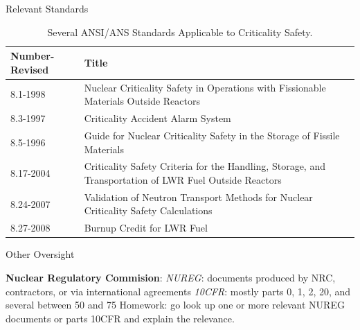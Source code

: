 \documentclass[10pt]{beamer}
\begin{document}
\begin{frame}{Relevant Standards}

\begin{table}[ht]
    \caption{Several ANSI/ANS Standards Applicable to Criticality Safety.}
    \begin{center} 
    \begin{tabular*}{1.00\textwidth}{@{\extracolsep{\fill}} p{3cm}p{} } 
      \toprule 
        Number-Revised    &  Title \\
      \midrule
       8.1-1998                  &  Nuclear Criticality Safety in Operations 
                                    with Fissionable Materials Outside 
                                    Reactors \\
       8.3-1997                  &  Criticality Accident Alarm System \\
       8.5-1996                  &  Guide for Nuclear Criticality Safety in 
                                    the Storage of Fissile Materials \\
       8.17-2004                 &  Criticality Safety Criteria for the 
                                    Handling, Storage, and Transportation 
                                    of LWR Fuel Outside Reactors \\
       8.24-2007                 &  Validation of Neutron Transport 
                                    Methods for Nuclear Criticality Safety 
                                    Calculations \\
       8.27-2008                 &  Burnup Credit for LWR Fuel \\
      \bottomrule 
    \end{tabular*} 
    \end{center} 
    \label{tbl:ansstandard}
\end{table}

\end{frame}

\begin{frame}{Other Oversight}

{\bf Nuclear Regulatory Commision}:
\vfill
{\it NUREG}: documents produced by NRC, contractors, or via international
agreements
\vfill
{\it 10CFR}: mostly parts 0, 1, 2, 20, and several between 50 and 75
\vfill
\textcolor{mitred}{Homework}: go look up one or more relevant NUREG documents or parts 10CFR and
explain the relevance.

\end{frame}
\end{document}
